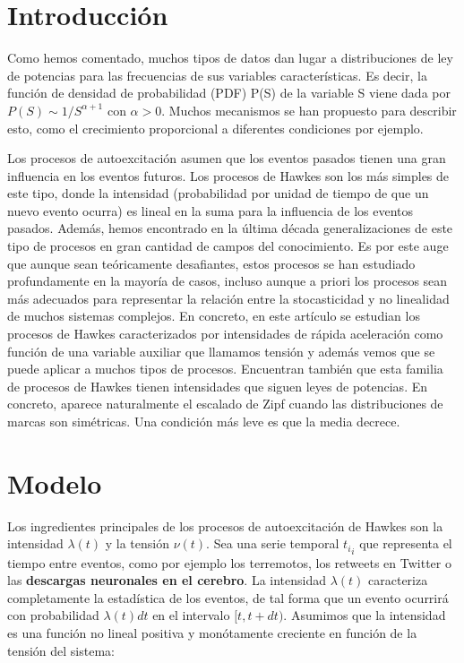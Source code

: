 \documentclass[a4paper,11pt]{book}
\begin{document}
\section{Introducción}

Como hemos comentado, muchos tipos de datos dan lugar a distribuciones de ley de potencias para las frecuencias de sus variables características. Es decir, 
la función de densidad de probabilidad (PDF) P(S) de la variable S viene dada por $P(S)\sim1/S^{\alpha+1}$ con $\alpha > 0$. Muchos mecanismos se han propuesto
para describir esto, como el crecimiento proporcional a diferentes condiciones por ejemplo.

Los procesos de autoexcitación asumen que los eventos pasados tienen una gran influencia en los eventos futuros. Los procesos de Hawkes son los más simples 
de este tipo, donde la intensidad (probabilidad por unidad de tiempo de que un nuevo evento ocurra) es lineal en la suma para la influencia de los eventos 
pasados. Además, hemos encontrado en la última década generalizaciones de este tipo de procesos en gran cantidad de campos del conocimiento. Es por este auge 
que aunque sean teóricamente desafiantes, estos procesos se han estudiado profundamente en la mayoría de casos, incluso aunque a priori los procesos 
sean más adecuados para representar la relación entre la stocasticidad y no linealidad de muchos sistemas complejos. En concreto, en este artículo se estudian 
los procesos de Hawkes caracterizados por intensidades de rápida aceleración como función de una variable auxiliar que llamamos tensión y además vemos que 
se puede aplicar a muchos tipos de procesos. Encuentran también que esta familia de procesos de Hawkes tienen intensidades que siguen leyes de potencias. En 
concreto, aparece naturalmente el escalado de Zipf cuando las distribuciones de marcas son simétricas. Una condición más leve es que la media decrece. 

\section{Modelo}

Los ingredientes principales de los procesos de autoexcitación de Hawkes son la intensidad $\lambda(t)$ y la tensión $\nu(t)$. Sea una serie temporal ${t_i}_i$
que representa el tiempo entre eventos, como por ejemplo los terremotos, los retweets en Twitter o las \textbf{descargas neuronales en el cerebro}.
La intensidad $\lambda(t)$ caracteriza completamente la estadística de los eventos, de tal forma que un evento ocurrirá con probabilidad $\lambda(t)dt$ en 
el intervalo $[t,t+dt)$. Asumimos que la intensidad es una función no lineal positiva y monótamente creciente en función de la tensión del sistema:
\end{document}
